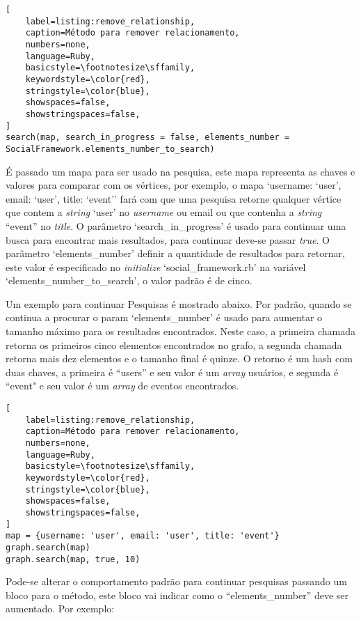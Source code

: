\begin{lstlisting}[
    label=listing:remove_relationship,
    caption=Método para remover relacionamento,
    numbers=none,
    language=Ruby,
    basicstyle=\footnotesize\sffamily,
    keywordstyle=\color{red},
    stringstyle=\color{blue},
    showspaces=false,
    showstringspaces=false,
]
search(map, search_in_progress = false, elements_number = SocialFramework.elements_number_to_search)
\end{lstlisting}

É passado um mapa para ser usado na pesquisa, este mapa representa as chaves e valores para comparar com os vértices, por exemplo, o mapa `{username: `user', email: `user', title: `event'}' fará com que uma pesquisa retorne qualquer vértice que contem a \textit{string} `user' no \textit{username} ou email ou que contenha a \textit{string} ``event'' no \textit{title}. O parâmetro `search\_in\_progress' é usado para continuar uma busca para encontrar mais resultados, para continuar deve-se passar \textit{true}. O parâmetro `elements\_number' definir a quantidade de resultados para retornar, este valor é especificado no \textit{initialize} `social\_framework.rb' na variável `elements\_number\_to\_search', o valor padrão é de cinco.

Um exemplo para continuar Pesquisas é mostrado abaixo. Por padrão, quando se continua a procurar o param `elements\_number' é usado para aumentar o tamanho máximo para os resultados encontrados. Neste caso, a primeira chamada retorna os primeiros cinco elementos encontrados no grafo, a segunda chamada retorna mais dez elementos e o tamanho final é quinze. O retorno é um hash com duas chaves, a primeira é ``users'' e seu valor é um \textit{array} usuários, e segunda é ``event" e seu valor é um \textit{array} de eventos encontrados.

\begin{lstlisting}[
    label=listing:remove_relationship,
    caption=Método para remover relacionamento,
    numbers=none,
    language=Ruby,
    basicstyle=\footnotesize\sffamily,
    keywordstyle=\color{red},
    stringstyle=\color{blue},
    showspaces=false,
    showstringspaces=false,
]
map = {username: 'user', email: 'user', title: 'event'}
graph.search(map)
graph.search(map, true, 10)
\end{lstlisting}

Pode-se alterar o comportamento padrão para continuar pesquisas passando um bloco para o método, este bloco vai indicar como o ``elements\_number'' deve ser aumentado. Por exemplo:

